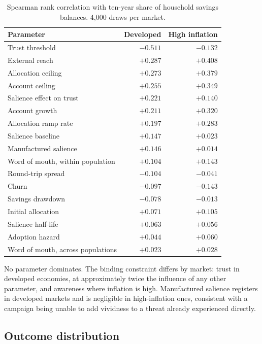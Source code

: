 \documentclass[11pt,a4paper]{article}
\begin{document}
\begin{table}[h]
\small
\begin{tabular}{@{}lrr@{}}
\toprule
Parameter & Developed & High inflation \\
\midrule
Trust threshold & $-0.511$ & $-0.132$ \\
External reach & $+0.287$ & $+0.408$ \\
Allocation ceiling & $+0.273$ & $+0.379$ \\
Account ceiling & $+0.255$ & $+0.349$ \\
Salience effect on trust & $+0.221$ & $+0.140$ \\
Account growth & $+0.211$ & $+0.320$ \\
Allocation ramp rate & $+0.197$ & $+0.283$ \\
Salience baseline & $+0.147$ & $+0.023$ \\
Manufactured salience & $+0.146$ & $+0.014$ \\
Word of mouth, within population & $+0.104$ & $+0.143$ \\
Round-trip spread & $-0.104$ & $-0.041$ \\
Churn & $-0.097$ & $-0.143$ \\
Savings drawdown & $-0.078$ & $-0.013$ \\
Initial allocation & $+0.071$ & $+0.105$ \\
Salience half-life & $+0.063$ & $+0.056$ \\
Adoption hazard & $+0.044$ & $+0.060$ \\
Word of mouth, across populations & $+0.023$ & $+0.028$ \\
\bottomrule
\end{tabular}
\caption{Spearman rank correlation with ten-year share of household savings
balances. 4{,}000 draws per market.}
\end{table}

No parameter dominates. The binding constraint differs by market: trust in
developed economies, at approximately twice the influence of any other
parameter, and awareness where inflation is high. Manufactured salience
registers in developed markets and is negligible in high-inflation ones,
consistent with a campaign being unable to add vividness to a threat already
experienced directly.

\subsection{Outcome distribution}
\end{document}
